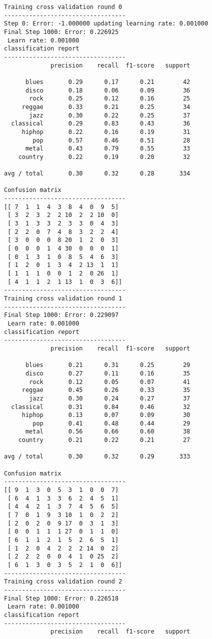 \documentclass{article}
\begin{document}
    \begin{Verbatim}[commandchars=\\\{\}]
Training cross validation round 0
----------------------------------
Step 0: Error: -1.000000 updating learning rate: 0.001000
Final Step 1000: Error: 0.226925 
 Learn rate: 0.001000
classification report 
----------------------------------
             precision    recall  f1-score   support

      blues       0.29      0.17      0.21        42
      disco       0.18      0.06      0.09        36
       rock       0.25      0.12      0.16        25
     reggae       0.33      0.21      0.25        34
       jazz       0.30      0.22      0.25        37
  classical       0.29      0.83      0.43        36
     hiphop       0.22      0.16      0.19        31
        pop       0.57      0.46      0.51        28
      metal       0.43      0.79      0.55        33
    country       0.22      0.19      0.20        32

avg / total       0.30      0.32      0.28       334

Confusion matrix
----------------------------------
[[ 7  1  1  4  3  8  4  0  9  5]
 [ 3  2  3  2  2 10  2  2 10  0]
 [ 3  1  3  3  2  3  3  0  4  3]
 [ 2  2  0  7  4  8  3  2  2  4]
 [ 3  0  0  0  8 20  1  2  0  3]
 [ 0  0  0  1  4 30  0  0  0  1]
 [ 0  1  3  1  0  8  5  4  6  3]
 [ 1  2  0  1  3  4  2 13  1  1]
 [ 1  1  1  0  0  1  2  0 26  1]
 [ 4  1  1  2  1 13  1  0  3  6]]
----------------------------------
Training cross validation round 1
----------------------------------
Final Step 1000: Error: 0.229097 
 Learn rate: 0.001000
classification report 
----------------------------------
             precision    recall  f1-score   support

      blues       0.21      0.31      0.25        29
      disco       0.27      0.11      0.16        35
       rock       0.12      0.05      0.07        41
     reggae       0.45      0.26      0.33        35
       jazz       0.30      0.24      0.27        37
  classical       0.31      0.84      0.46        32
     hiphop       0.13      0.07      0.09        30
        pop       0.41      0.48      0.44        29
      metal       0.56      0.66      0.60        38
    country       0.21      0.22      0.21        27

avg / total       0.30      0.32      0.29       333

Confusion matrix
----------------------------------
[[ 9  1  3  0  5  3  1  0  0  7]
 [ 6  4  1  3  3  6  2  4  5  1]
 [ 4  4  2  1  3  7  4  5  6  5]
 [ 7  0  1  9  3 10  1  0  2  2]
 [ 2  0  2  0  9 17  0  3  1  3]
 [ 0  0  1  1  1 27  0  1  1  0]
 [ 6  1  1  2  1  5  2  6  5  1]
 [ 1  2  0  4  2  2  2 14  0  2]
 [ 2  2  2  0  0  4  1  0 25  2]
 [ 6  1  3  0  3  5  2  1  0  6]]
----------------------------------
Training cross validation round 2
----------------------------------
Final Step 1000: Error: 0.226518 
 Learn rate: 0.001000
classification report 
----------------------------------
             precision    recall  f1-score   support


\end{Verbatim}
\end{document}
